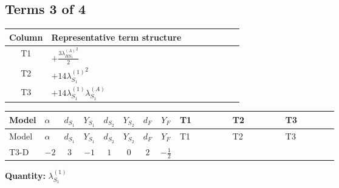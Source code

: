 \documentclass[8pt]{article}
\begin{document}
\begin{landscape}
\subsection*{Terms 3 of 4}
\begin{center}
\begin{tabular}{@{}c >{\raggedright\arraybackslash}p{0.82\linewidth}@{}}
\toprule
Column & Representative term structure \\
\midrule
T1 & \(\displaystyle +\frac{3 {\lambda_{HS_1}^{(A)}}^2}{2}\) \\
\midrule
T2 & \(\displaystyle +14 {\lambda_{S_1}^{(1)}}^2\) \\
\midrule
T3 & \(\displaystyle +14 {\lambda_{S_1}^{(1)}} {\lambda_{S_1}^{(A)}}\) \\
\midrule
\bottomrule
\end{tabular}
\end{center}
\smallskip
\tiny
\begin{longtable}{@{}llcccccc >{\raggedright\arraybackslash}p{0.21\linewidth} >{\raggedright\arraybackslash}p{0.21\linewidth} >{\raggedright\arraybackslash}p{0.21\linewidth}@{}}
\toprule
Model & $\alpha$ & $d_{S_1}$ & $Y_{S_1}$ & $d_{S_2}$ & $Y_{S_2}$ & $d_F$ & $Y_F$ & T1 & T2 & T3 \\
\midrule
\endfirsthead
\toprule
Model & $\alpha$ & $d_{S_1}$ & $Y_{S_1}$ & $d_{S_2}$ & $Y_{S_2}$ & $d_F$ & $Y_F$ & T1 & T2 & T3 \\
\midrule
\endhead
T3-D & $-2$ & $3$ & $-1$ & $1$ & $0$ & $2$ & $-\frac{1}{2}$ & \scriptsize\adjustbox{max width=\linewidth}{$\begin{gathered} +\frac{3 {\lambda_{HS_1}^{(A)}}^2}{2}\end{gathered}$} & \scriptsize\adjustbox{max width=\linewidth}{$\begin{gathered} +14 {\lambda_{S_1}^{(1)}}^2\end{gathered}$} & \scriptsize\adjustbox{max width=\linewidth}{$\begin{gathered} +14 {\lambda_{S_1}^{(1)}} {\lambda_{S_1}^{(A)}}\end{gathered}$} \\
\midrule
\bottomrule
\end{longtable}
\clearpage
\noindent\textbf{Quantity: }$\lambda_{S_1}^{(1)}$\par\smallskip

\end{landscape}
\end{document}
